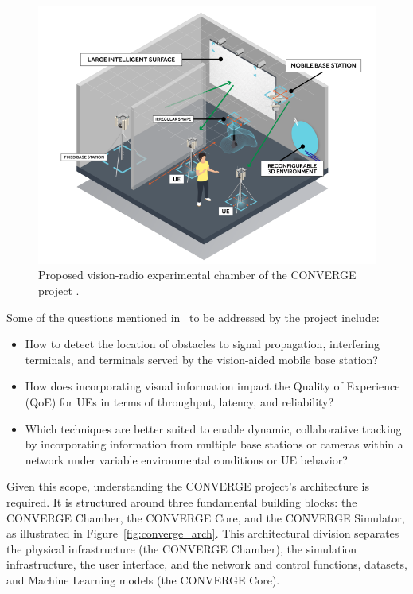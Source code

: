 \begin{figure}[H]
    \centering
    \includegraphics[width=0.7\linewidth]{figures/chamber_converge}
    \caption[Proposed vision-radio experimental chamber of the CONVERGE project]{Proposed vision-radio experimental chamber of the CONVERGE project \cite{converge2023_usecases}.}
    \label{fig:chamber_converge}
\end{figure}



Some of the questions mentioned in~\cite{converge2023_usecases} to be addressed by the project include:

\begin{itemize}
    \item How to detect the location of obstacles to signal propagation, interfering terminals, and terminals served by the vision-aided mobile base station?
    \item How does incorporating visual information impact the Quality of Experience (QoE) for UEs in terms of throughput, latency, and reliability?
    \item Which techniques are better suited to enable dynamic, collaborative tracking by incorporating information from multiple base stations or cameras within a network under variable environmental conditions or UE behavior?
\end{itemize}

Given this scope, understanding the CONVERGE project’s architecture is required.
It is
structured around three fundamental building blocks: the CONVERGE Chamber, the CONVERGE Core, and the CONVERGE Simulator, as illustrated in Figure~\ref{fig:converge_arch}.
This architectural division separates the physical infrastructure (the CONVERGE Chamber), the simulation infrastructure, the user interface, and the network and control functions, datasets,
and Machine Learning models (the CONVERGE Core).

